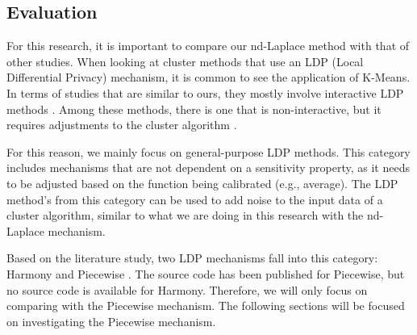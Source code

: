 \subsection{Evaluation}

For this research, it is important to compare our nd-Laplace method with that of other studies.
When looking at cluster methods that use an LDP (Local Differential Privacy) mechanism, it is common to see the application of K-Means.
In terms of studies that are similar to ours, they mostly involve interactive LDP methods \citep{xia_distributed_2020, yuan_privacypreserving_2021, 9679364}.
Among these methods, there is one that is non-interactive, but it requires adjustments to the cluster algorithm \citep{sun_distributed_2019}.

For this reason, we mainly focus on general-purpose LDP methods.
This category includes mechanisms that are not dependent on a sensitivity property, as it needs to be adjusted based on the function being calibrated (e.g., average).
The LDP method's from this category can be used to add noise to the input data of a cluster algorithm, similar to what we are doing in this research with the nd-Laplace mechanism.

Based on the literature study, two LDP mechanisms fall into this category: Harmony and Piecewise \citep{nguyen_collecting_2016, wang_collecting_2019}.
The source code has been published for Piecewise, but no source code is available for Harmony.
Therefore, we will only focus on comparing with the Piecewise mechanism.
The following sections will be focused on investigating the Piecewise mechanism.

